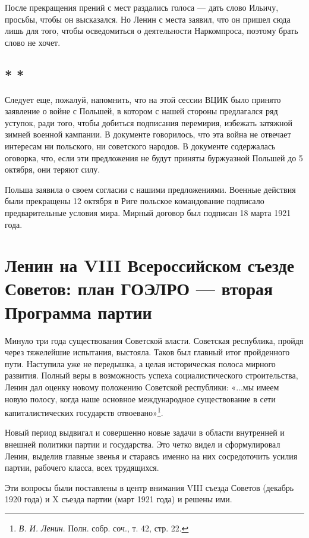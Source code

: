 \documentclass[12pt, a4paper, openany]{book}
\begin{document}
После прекращения прений с мест раздались голоса — дать слово Ильичу, просьбы, чтобы он высказался. Но Ленин с места заявил, что он пришел сюда лишь для того, чтобы осведомиться о деятельности Наркомпроса, поэтому брать слово не хочет.

\subsection*{\center * * *}

Следует еще, пожалуй, напомнить, что на этой сессии ВЦИК было принято заявление о войне с Польшей, в котором с нашей стороны предлагался ряд уступок, ради того, чтобы добиться подписания перемирия, избежать затяжной зимней военной кампании. В документе говорилось, что эта война не отвечает интересам ни польского, ни советского народов. В документе содержалась оговорка, что, если эти предложения не будут приняты буржуазной Польшей до 5 октября, они теряют силу.

Польша заявила о своем согласии с нашими предложениями. Военные действия были прекращены 12 октября в Риге польское командование подписало предварительные условия мира. Мирный договор был подписан 18 марта 1921 года.

\newpage
\section[Ленин на VIII Всероссийском съезде Советов: план ГОЭЛРО — вторая Программа партии]{\center \textbf{Ленин на VIII Всероссийском съезде Советов: план ГОЭЛРО — вторая Программа партии}}



Минуло три года существования Советской власти. Советская республика, пройдя через тяжелейшие испытания, выстояла. Таков был главный итог пройденного пути. Наступила уже не передышка, а целая историческая полоса мирного развития. Полный веры в возможность успеха социалистического строительства, Ленин дал оценку новому положению Советской республики: «...мы имеем новую полосу, когда наше основное международное существование в сети капиталистических государств отвоевано»\footnote{\textit{В. И. Ленин}. Полн. собр. соч., т. 42, стр. 22.}.

Новый период выдвигал и совершенно новые задачи в области внутренней и внешней политики партии и государства. Это четко видел и сформулировал Ленин, выделив главные звенья и стараясь именно на них сосредоточить усилия партии, рабочего класса, всех трудящихся.

Эти вопросы были поставлены в центр внимания VIII съезда Советов (декабрь 1920 года) и X съезда партии (март 1921 года) и решены ими.
\end{document}
